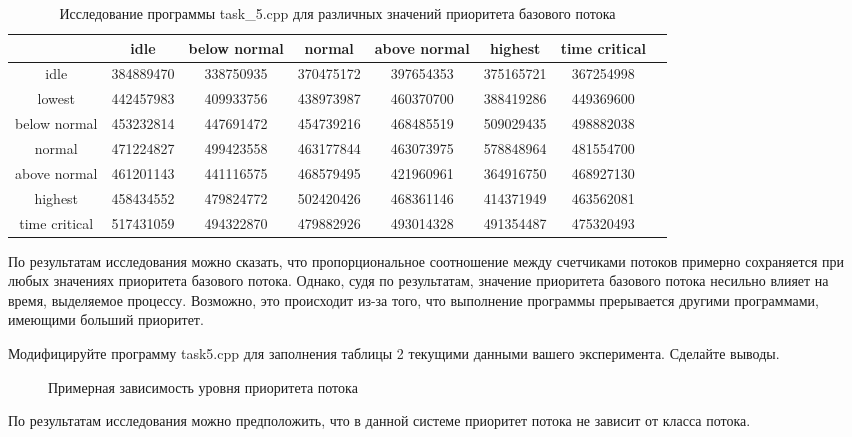 \documentclass[a4paper]{article}
\begin{document}
	\begin{table}[h!]
		\small
		\begin{tabular}{|c|c|c|c|c|c|c|c|}
		\hline 
		& idle & below normal & normal & above normal & highest & time critical \\ 
		\hline 
		idle & 384889470 & 338750935 & 370475172 & 397654353 & 375165721 & 367254998   \\ 
		\hline 
		lowest & 442457983 & 409933756 & 438973987 & 460370700 & 388419286 & 449369600 \\ 
		\hline 
		below normal & 453232814 & 447691472 & 454739216 & 468485519 & 509029435 & 498882038 \\ 
		\hline 
		normal & 471224827 & 499423558 & 463177844 & 463073975 & 578848964 & 481554700 \\ 
		\hline 
		above normal & 461201143 & 441116575 & 468579495 & 421960961 & 364916750 & 468927130 \\ 
		\hline 
		highest & 458434552 & 479824772 & 502420426 & 468361146 & 414371949 & 463562081\\ 
		\hline 
		time critical & 517431059 & 494322870 & 479882926 & 493014328 & 491354487 & 475320493\\ 
		\hline 
		\end{tabular} 
		\caption{Исследование программы task\_5.cpp для различных значений приоритета базового потока}
	\end{table}
	
	По результатам исследования можно сказать, что пропорциональное соотношение между счетчиками потоков примерно сохраняется при любых значениях приоритета базового потока. Однако, судя по результатам, значение приоритета базового потока несильно влияет на время, выделяемое процессу. Возможно, это происходит из-за того, что выполнение программы прерывается другими программами, имеющими больший приоритет.
	
	Модифицируйте программу task5.cpp для заполнения таблицы 2 текущими данными вашего эксперимента. Сделайте выводы.
	\begin{figure}[h!]
		\caption{Примерная зависимость уровня приоритета потока}
		\label{img:prio_dep}
	\end{figure}
	По результатам исследования можно предположить, что в данной системе приоритет потока не зависит от класса потока.\\
	
\end{document}
